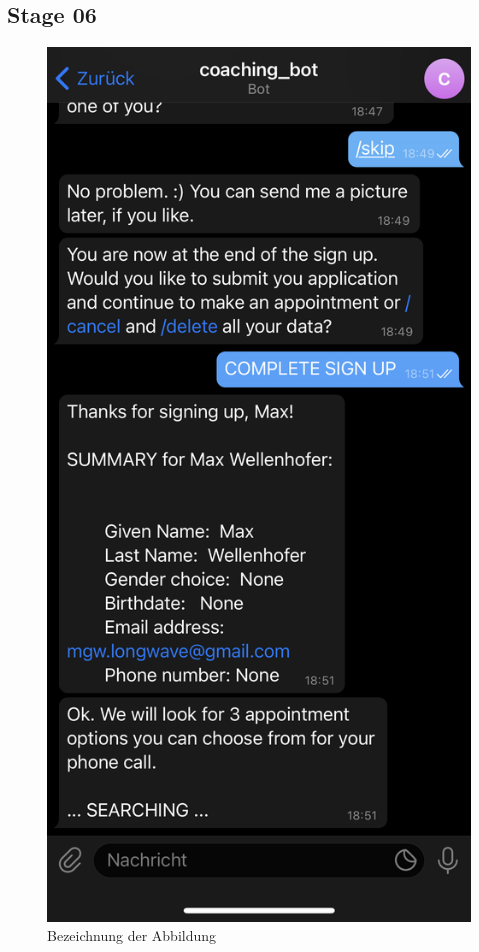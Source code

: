 \subsection{Stage 06}
\begin{figure} %
	\centering
	\includegraphics{images/coaching_bot_dummy_screenshot.jpeg}
	\caption{Bezeichnung der Abbildung}
	\label{a7}
\end{figure}


